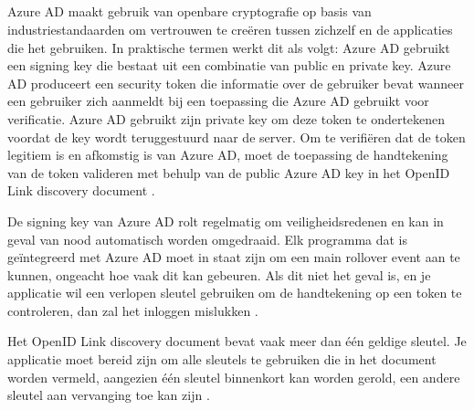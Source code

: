 \subsection{}
Azure AD maakt gebruik van openbare cryptografie op basis van industriestandaarden om vertrouwen te creëren tussen zichzelf en de applicaties die het gebruiken. In praktische termen werkt dit als volgt: Azure AD gebruikt een signing key die bestaat uit een combinatie van public en private key. Azure AD produceert een security token die informatie over de gebruiker bevat wanneer een gebruiker zich aanmeldt bij een toepassing die Azure AD gebruikt voor verificatie. Azure AD gebruikt zijn private key om deze token te ondertekenen voordat de key wordt teruggestuurd naar de server. Om te verifiëren dat de token legitiem is en afkomstig is van Azure AD, moet de toepassing de handtekening van de token valideren met behulp van de public Azure AD key in het OpenID Link discovery document  \autocite{Boucher2019} \autocite{msaburnley2019}.

De signing key van Azure AD rolt regelmatig om veiligheidsredenen en kan in geval van nood automatisch worden omgedraaid. Elk programma dat is geïntegreerd met Azure AD moet in staat zijn om een main rollover event aan te kunnen, ongeacht hoe vaak dit kan gebeuren. Als dit niet het geval is, en je applicatie wil een verlopen sleutel gebruiken om de handtekening op een token te controleren, dan zal het inloggen mislukken  \autocite{Boucher2019} \autocite{msaburnley2019} \autocite{rwike772018}.

Het OpenID Link discovery document bevat vaak meer dan één geldige sleutel. Je applicatie moet bereid zijn om alle sleutels te gebruiken die in het document worden vermeld, aangezien één sleutel binnenkort kan worden gerold, een andere sleutel aan vervanging toe kan zijn  \autocite{Boucher2019} \autocite{msaburnley2019}.
